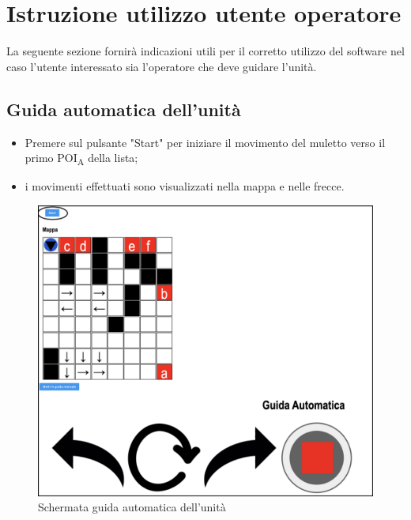 \section{Istruzione utilizzo utente operatore}
La seguente sezione fornirà indicazioni utili per il corretto utilizzo del software nel caso l'utente interessato sia l'operatore che deve guidare l'unità.

\subsection{Guida automatica dell'unità}
\begin{itemize}
    \item Premere sul pulsante "Start" per iniziare il movimento del muletto verso il primo POI\textsubscript{A} della lista;
    \item i movimenti effettuati sono visualizzati nella mappa e nelle frecce.
    
\end{itemize}
\begin{figure}[H]
    \centering
    \includegraphics[scale=0.45]{res/images/forklift_start.png}
    \caption{Schermata guida automatica dell'unità}
\end{figure}
\pagebreak
